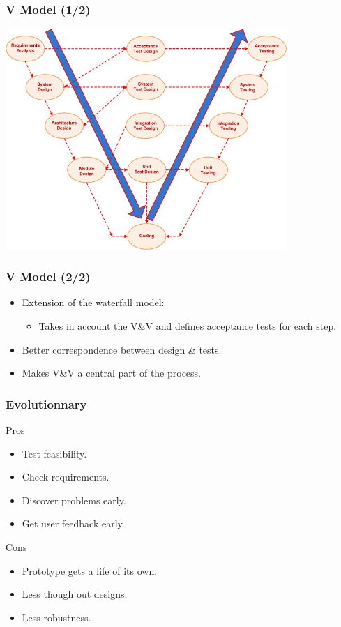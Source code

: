 \documentclass[10pt, handout]{beamer}
\begin{document}
\begin{frame}[fragile]
  \frametitle{V Model (1/2)}
  \begin{center}
    \includegraphics[width=0.8\textwidth]{V-model}
  \end{center}
\end{frame}
\begin{frame}[fragile]
  \frametitle{V Model (2/2)}
  \begin{exampleblock}{}
    \begin{itemize}
    \item Extension of the waterfall model:
      \begin{itemize}
      \item Takes in account the V\&V and defines acceptance tests for each step.
      \end{itemize}
    \item Better correspondence between design \& tests.
    \item Makes V\&V a central part of the process.
    \end{itemize}
  \end{exampleblock}
\end{frame}


\begin{frame}[fragile]
  \frametitle{Evolutionnary}
  \begin{exampleblock}{Pros}
    \begin{itemize}
    \item Test feasibility.
    \item Check requirements.
    \item Discover problems early.
    \item Get user feedback early.
    \end{itemize}
  \end{exampleblock}
  \begin{alertblock}{Cons}
    \begin{itemize}
    \item Prototype gets a life of its own.
    \item Less though out designs.
    \item Less robustness.
    \end{itemize}
  \end{alertblock}
\end{frame}
\end{document}
